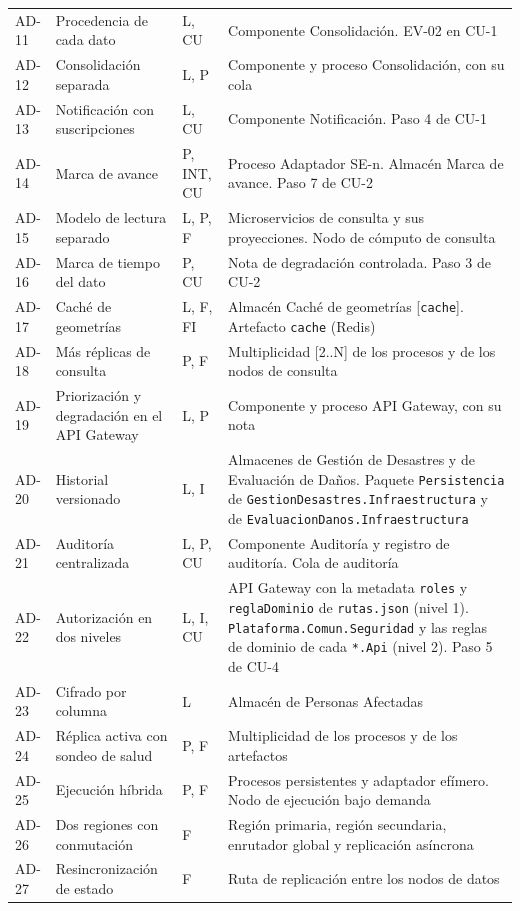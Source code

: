 \documentclass[11pt,letterpaper]{article}
\providecommand{\br}{\discretionary{}{}{}}
\begin{document}
\begin{longtable}{L{1.3cm} L{5.2cm} L{1.6cm} L{7.4cm}}
AD-11 & Procedencia de cada dato & L, CU & Componente Consolidación. EV-02 en CU-1 \\
AD-12 & Consolidación separada & L, P & Componente y proceso Consolidación, con su cola \\
AD-13 & Notificación con suscripciones & L, CU & Componente Notificación. Paso 4 de CU-1 \\
AD-14 & Marca de avance & P, INT, CU & Proceso Adaptador SE-n. Almacén Marca de avance. Paso 7 de
CU-2 \\
AD-15 & Modelo de lectura separado & L, P, F & Microservicios de consulta y sus proyecciones. Nodo
de cómputo de consulta \\
AD-16 & Marca de tiempo del dato & P, CU & Nota de degradación controlada. Paso 3 de CU-2 \\
AD-17 & Caché de geometrías & L, F, FI & Almacén Caché de geometrías [\texttt{cache}]. Artefacto
\texttt{cache} (Redis) \\
AD-18 & Más réplicas de consulta & P, F & Multiplicidad [2..N] de los procesos y de los nodos de
consulta \\
AD-19 & Priorización y degradación en el API Gateway & L, P & Componente y proceso API Gateway, con
su nota \\
AD-20 & Historial versionado & L, I & Almacenes de Gestión de Desastres y de Evaluación de Daños.
Paquete \texttt{Persistencia} de \texttt{GestionDesastres.\br{}Infraestructura} y de
\texttt{EvaluacionDanos.\br{}Infraestructura} \\
AD-21 & Auditoría centralizada & L, P, CU & Componente Auditoría y registro de auditoría. Cola de
auditoría \\
AD-22 & Autorización en dos niveles & L, I, CU & API Gateway con la metadata \texttt{roles} y
\texttt{reglaDominio} de \texttt{rutas.json} (nivel 1). \texttt{Plataforma.\br{}Comun.\br{}Seguridad} y las
reglas de dominio de cada \texttt{*.Api} (nivel 2). Paso 5 de CU-4 \\
AD-23 & Cifrado por columna & L & Almacén de Personas Afectadas \\
AD-24 & Réplica activa con sondeo de salud & P, F & Multiplicidad de los procesos y de los
artefactos \\
AD-25 & Ejecución híbrida & P, F & Procesos persistentes y adaptador efímero. Nodo de ejecución bajo
demanda \\
AD-26 & Dos regiones con conmutación & F & Región primaria, región secundaria, enrutador global y
replicación asíncrona \\
AD-27 & Resincronización de estado & F & Ruta de replicación entre los nodos de datos \\

\end{longtable}
\end{document}
